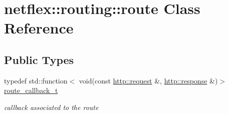 \hypertarget{classnetflex_1_1routing_1_1route}{}\section{netflex\+:\+:routing\+:\+:route Class Reference}
\label{classnetflex_1_1routing_1_1route}
\subsection*{Public Types}
\begin{DoxyCompactItemize}
\item 
\mbox{\label{classnetflex_1_1routing_1_1route_a5af1479be27de20f7c395bf2fb0f3639}} 
typedef std\+::function$<$ void(const \hyperlink{classnetflex_1_1http_1_1request}{http\+::request} \&, \hyperlink{classnetflex_1_1http_1_1response}{http\+::response} \&)$>$ \hyperlink{classnetflex_1_1routing_1_1route_a5af1479be27de20f7c395bf2fb0f3639}{route\+\_\+callback\+\_\+t}
\begin{DoxyCompactList}\small\item\em callback associated to the route \end{DoxyCompactList}\end{DoxyCompactItemize}
